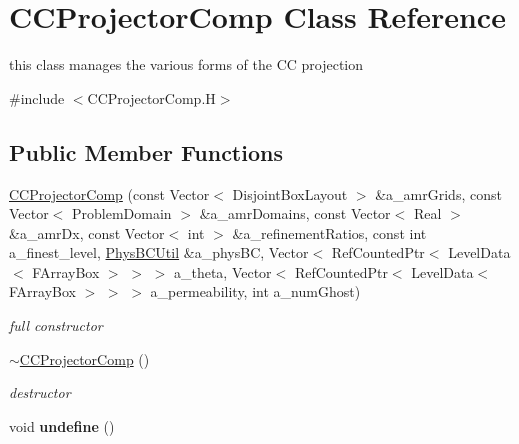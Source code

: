 \hypertarget{class_c_c_projector_comp}{\section{C\-C\-Projector\-Comp Class Reference}
\label{class_c_c_projector_comp}
}


this class manages the various forms of the C\-C projection  




{\ttfamily \#include $<$C\-C\-Projector\-Comp.\-H$>$}

\subsection*{Public Member Functions}
\begin{DoxyCompactItemize}
\item 
\hypertarget{class_c_c_projector_comp_a6ea3307125255b40eb48545c66764699}{\hyperlink{class_c_c_projector_comp_a6ea3307125255b40eb48545c66764699}{C\-C\-Projector\-Comp} (const Vector$<$ Disjoint\-Box\-Layout $>$ \&a\-\_\-amr\-Grids, const Vector$<$ Problem\-Domain $>$ \&a\-\_\-amr\-Domains, const Vector$<$ Real $>$ \&a\-\_\-amr\-Dx, const Vector$<$ int $>$ \&a\-\_\-refinement\-Ratios, const int a\-\_\-finest\-\_\-level, \hyperlink{class_phys_b_c_util}{Phys\-B\-C\-Util} \&a\-\_\-phys\-B\-C, Vector$<$ Ref\-Counted\-Ptr$<$ Level\-Data$<$ F\-Array\-Box $>$ $>$ $>$ a\-\_\-theta, Vector$<$ Ref\-Counted\-Ptr$<$ Level\-Data$<$ F\-Array\-Box $>$ $>$ $>$ a\-\_\-permeability, int a\-\_\-num\-Ghost)}\label{class_c_c_projector_comp_a6ea3307125255b40eb48545c66764699}

\begin{DoxyCompactList}\small\item\em full constructor \end{DoxyCompactList}\item 
\hypertarget{class_c_c_projector_comp_add3a014849722f444606e314490bfff3}{\hyperlink{class_c_c_projector_comp_add3a014849722f444606e314490bfff3}{$\sim$\-C\-C\-Projector\-Comp} ()}\label{class_c_c_projector_comp_add3a014849722f444606e314490bfff3}

\begin{DoxyCompactList}\small\item\em destructor \end{DoxyCompactList}\item 
\hypertarget{class_c_c_projector_comp_a5ba04bbba6d1ebf8e178ce7af050987b}{void {\bfseries undefine} ()}\label{class_c_c_projector_comp_a5ba04bbba6d1ebf8e178ce7af050987b}


\end{DoxyCompactItemize}

